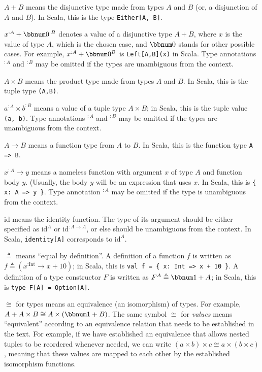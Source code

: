 $A+B$ means the disjunctive type made from types $A$ and $B$ (or,
a disjunction of $A$ and $B$). In Scala, this is the type \texttt{}\lstinline!Either[A, B]!.

$x^{:A}+\bbnum 0^{:B}$ denotes a value of a disjunctive type $A+B$,
where $x$ is the value of type $A$, which is the chosen case, and
$\bbnum 0$ stands for other possible cases. For example, $x^{:A}+\bbnum 0^{B}$
is \lstinline!Left[A,B](x)! in Scala. Type annotations $^{:A}$ and
$^{:B}$ may be omitted if the types are unambiguous from the context.

$A\times B$ means the product type made from types $A$ and $B$.
In Scala, this is the tuple type \lstinline!(A,B)!.

$a^{:A}\times b^{:B}$ means a value of a tuple type $A\times B$;
in Scala, this is the tuple value \lstinline!(a, b)!. Type annotations
$^{:A}$ and $^{:B}$ may be omitted if the types are unambiguous
from the context.

$A\rightarrow B$ means a function type from $A$ to $B$. In Scala,
this is the function type \lstinline!A => B!.

$x^{:A}\rightarrow y$ means a nameless function with argument $x$
of type $A$ and function body $y$. (Usually, the body $y$ will
be an expression that uses $x$. In Scala, this is \lstinline!{ x: A => y }!.
Type annotation $^{:A}$ may be omitted if the type is unambiguous
from the context.

$\text{id}$ means the identity function. The type of its argument
should be either specified as $\text{id}^{A}$ or $\text{id}^{:A\rightarrow A}$,
or else should be unambiguous from the context. In Scala,  \lstinline!identity[A]!
corresponds to $\text{id}^{A}$.

$\triangleq$ means \textsf{``}equal by definition\textsf{''}. A definition of a function
$f$ is written as $f\triangleq(x^{:\text{Int}}\rightarrow x+10)$;
in Scala, this is \lstinline!val f = { x: Int => x + 10 }!. A definition
of a type constructor $F$ is written as $F^{A}\triangleq\bbnum 1+A$;
in Scala, this is \lstinline!type F[A] = Option[A]!.

$\cong$ for types means an equivalence (an isomorphism) of types.
For example, $A+A\times B\cong A\times\left(\bbnum 1+B\right)$. The
same symbol $\cong$ for \emph{values} means \textsf{``}equivalent\textsf{''} according
to an equivalence relation that needs to be established in the text.
For example, if we have established an equivalence that allows nested
tuples to be reordered whenever needed, we can write $\left(a\times b\right)\times c\cong a\times\left(b\times c\right)$,
meaning that these values are mapped to each other by the established
isomorphism functions. 

